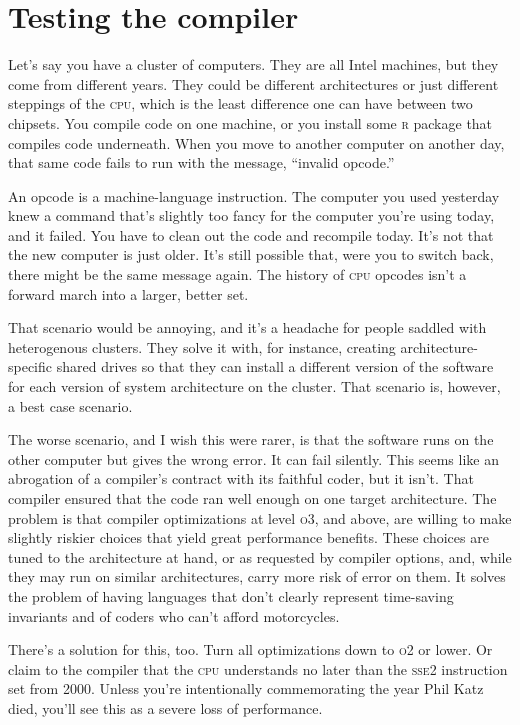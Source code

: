 \documentclass[fleqn,10pt]{olplainarticle}
\newcommand{\rlang}{\textsc{r}\xspace}
\newcommand{\cpu}{\textsc{cpu}\xspace}
\begin{document}
\section{Testing the compiler}\label{sec:test-compiler}

Let's say you have a cluster of computers. They are all Intel machines,
but they come from different years. They could be different architectures
or just different steppings of the \cpu, which is the least difference
one can have between two chipsets. You compile code on one machine,
or you install some \rlang package that compiles code underneath. When
you move to another computer on another day, that same code fails
to run with the message, ``invalid opcode.''

An opcode is a machine-language instruction. The computer you used
yesterday knew a command that's slightly too fancy for the computer
you're using today, and it failed. You have to clean out the code
and recompile today. It's not that the new computer is just older.
It's still possible that, were you to switch back, there might be
the same message again. The history of \cpu opcodes isn't a forward
march into a larger, better set.

That scenario would be annoying, and it's a headache for people
saddled with heterogenous clusters. They solve it with, for instance,
creating architecture-specific shared drives so that they can
install a different version of the software for each version of
system architecture on the cluster. That scenario is, however, a
best case scenario.

The worse scenario, and I wish this were rarer, is that the
software runs on the other computer but gives the wrong error.
It can fail silently. This seems like an abrogation of a compiler's
contract with its faithful coder, but it isn't. That compiler
ensured that the code ran well enough on one target architecture.
The problem is that compiler optimizations at level \textsc{o3}, and above,
are willing to make slightly riskier choices that yield great
performance benefits. These choices are tuned to the architecture
at hand, or as requested by compiler options, and, while they may
run on similar architectures, carry more risk of error on them.
It solves the problem of having languages
that don't clearly represent time-saving invariants and of coders
who can't afford motorcycles.

There's a solution for this, too. Turn all optimizations down
to \textsc{o2} or lower. Or claim to the compiler that the \cpu
understands no later than the \textsc{sse2} instruction set from 2000.
Unless you're intentionally commemorating the year Phil Katz died, you'll see
this as a severe loss of performance.
\end{document}
